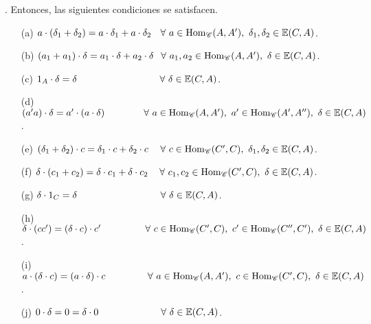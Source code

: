 \documentclass[preview]{standalone}
\begin{document}
\begin{center}
. Entonces, las siguientes condiciones se satisfacen. \begin{enumerate} \item[(a)] $a\cdot(\delta_1+\delta_2) = a\cdot\delta_1 + a\cdot\delta_2 \hspace{-0.175mm} \quad \forall \ a\in\text{Hom}_\mathscr{C}(A,A'), \ \delta_1,\delta_2\in\mathbb{E}(C,A)$. \item[(b)] $(a_1+a_1)\cdot\delta = a_1\cdot\delta + a_2\cdot\delta \quad \hspace{-0.845mm} \forall \ a_1,a_2\in\text{Hom}_\mathscr{C}(A,A'), \ \delta\in\mathbb{E}(C,A)$. \item[(c)] $1_A\cdot\delta = \delta \hspace{3.0475cm} \forall \ \delta\in\mathbb{E}(C,A)$. \item[(d)] $(a'a)\cdot\delta = a'\cdot(a\cdot\delta) \hspace{1.45cm} \forall \ a\in\text{Hom}_\mathscr{C}(A,A'), \ a'\in\text{Hom}_\mathscr{C}(A',A''), \ \delta\in\mathbb{E}(C,A)$. \item[(e)] $(\delta_1+\delta_2)\cdot c = \delta_1\cdot c + \delta_2\cdot c \hspace{4.425mm} \forall \ c\in\text{Hom}_\mathscr{C}(C',C), \ \delta_1,\delta_2\in\mathbb{E}(C,A)$. \item[(f)] $\delta\cdot(c_1+c_2)=\delta\cdot c_1 + \delta\cdot c_2 \hspace{4.22mm} \forall \ c_1,c_2\in\text{Hom}_\mathscr{C}(C',C), \ \delta\in\mathbb{E}(C,A)$. \item[(g)] $\delta\cdot1_C  = \delta \hspace{3.055cm} \forall \ \delta\in\mathbb{E}(C,A)$. \item[(h)] $\delta\cdot(cc') = (\delta\cdot c)\cdot c' \hspace{1.65cm} \forall \ c\in\text{Hom}_\mathscr{C}(C',C), \ c'\in\text{Hom}_\mathscr{C}(C'',C'), \ \delta\in\mathbb{E}(C,A)$. \item[(i)] $a\cdot(\delta\cdot c) = (a\cdot\delta)\cdot c \hspace{1.55cm} \forall \ a\in\text{Hom}_\mathscr{C}(A,A'), \ c\in\text{Hom}_\mathscr{C}(C',C), \ \delta\in\mathbb{E}(C,A)$. \item[(j)] $0\cdot\delta = 0 = \delta\cdot0 \hspace{2.3cm} \forall \ \delta\in\mathbb{E}(C,A)$. \end{enumerate}
\end{center}
\end{document}
